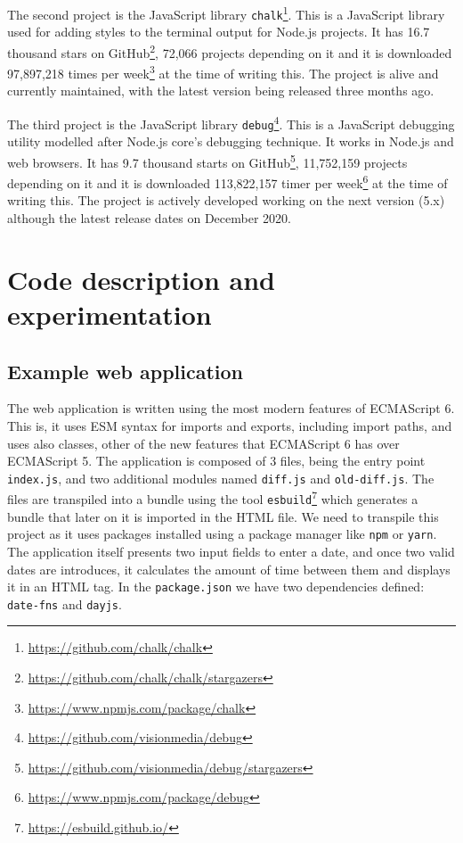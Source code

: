 \documentclass{uvamscse}
\begin{document}
The second project is the JavaScript library \texttt{chalk}\footnote{\url{https://github.com/chalk/chalk}}. This is a JavaScript library used for adding styles to the terminal output for Node.js projects. It has 16.7 thousand stars on GitHub\footnote{\url{https://github.com/chalk/chalk/stargazers}}, 72,066 projects depending on it and it is downloaded 97,897,218 times per week\footnote{\url{https://www.npmjs.com/package/chalk}} at the time of writing this. The project is alive and currently maintained, with the latest version being released three months ago. 

The third project is the JavaScript library \texttt{debug}\footnote{\url{https://github.com/visionmedia/debug}}. This is a JavaScript debugging utility modelled after Node.js core's debugging technique. It works in Node.js and web browsers. It has 9.7 thousand starts on GitHub\footnote{\url{https://github.com/visionmedia/debug/stargazers}}, 11,752,159 projects depending on it and it is downloaded 113,822,157 timer per week\footnote{\url{https://www.npmjs.com/package/debug}} at the time of writing this. The project is actively developed working on the next version (5.x) although the latest release dates on December 2020.

\section{Code description and experimentation}
\subsection{Example web application}
The web application is written using the most modern features of ECMAScript 6. This is, it uses ESM syntax for imports and exports, including import paths, and uses also classes, other of the new features that ECMAScript 6 has over ECMAScript 5. The application is composed of 3 files, being the entry point \texttt{index.js}, and two additional modules named \texttt{diff.js} and \texttt{old-diff.js}. The files are transpiled into a bundle using the tool \texttt{esbuild}\footnote{\url{https://esbuild.github.io/}} which generates a bundle that later on it is imported in the HTML file. We need to transpile this project as it uses packages installed using a package manager like \texttt{npm} or \texttt{yarn}. The application itself presents two input fields to enter a date, and once two valid dates are introduces, it calculates the amount of time between them and displays it in an HTML tag. In the \texttt{package.json} we have two dependencies defined: \texttt{date-fns} and \texttt{dayjs}.
\end{document}

